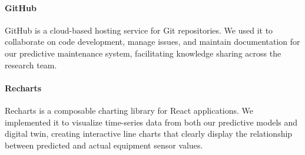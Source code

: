 \paragraph{GitHub} GitHub is a cloud-based hosting service for Git repositories. We used it to collaborate on code development, manage issues, and maintain documentation for our predictive maintenance system, facilitating knowledge sharing across the research team.

\paragraph{Recharts} Recharts is a composable charting library for React applications. We implemented it to visualize time-series data from both our predictive models and digital twin, creating interactive line charts that clearly display the relationship between predicted and actual equipment sensor values.
